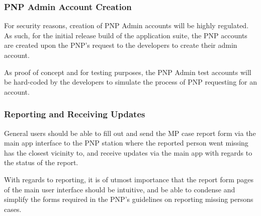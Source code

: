 \subsubsection{PNP Admin Account Creation}

For security reasons, creation of PNP Admin accounts will be highly regulated. As such, for the initial release build of the application suite, the PNP accounts are created upon the PNP's request to the developers to create their admin account.

As proof of concept and for testing purposes, the PNP Admin test accounts will be hard-coded by the developers to simulate the process of PNP requesting for an account. 


\subsubsection{Reporting and Receiving Updates}
General users should be able to fill out and send the MP case report form via the main app interface to the PNP station where the reported person went missing has the closest vicinity to, and receive updates via the main app with regards to the status of the report.

With regards to reporting, it is of utmost importance that the report form pages of the main user interface should be intuitive, and be able to condense and simplify the forms required in the PNP's guidelines on reporting missing persons cases.

